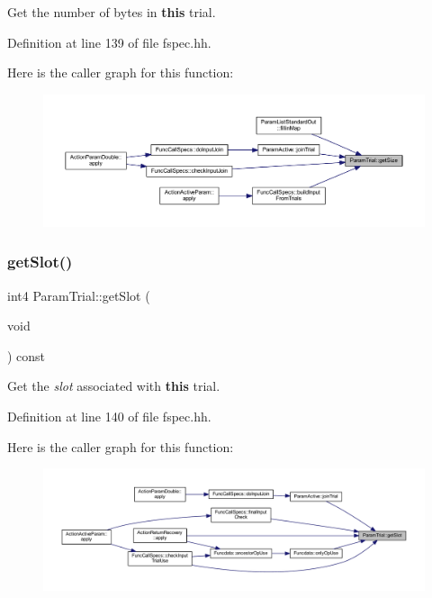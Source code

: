 Get the number of bytes in {\bfseries{this}} trial. 



Definition at line 139 of file fspec.\+hh.

Here is the caller graph for this function\+:
\nopagebreak
\begin{figure}[H]
\begin{center}
\leavevmode
\includegraphics[width=350pt]{class_param_trial_a92758568d74f243b6680258fa8cb440a_icgraph}
\end{center}
\end{figure}
\mbox{\label{class_param_trial_a54cb5c24617993dc4f2a6548059d2e10}} 
\subsubsection{\texorpdfstring{getSlot()}{getSlot()}}
{\footnotesize\ttfamily int4 Param\+Trial\+::get\+Slot (\begin{DoxyParamCaption}\item[{void}]{ }\end{DoxyParamCaption}) const\hspace{0.3cm}{\ttfamily [inline]}}



Get the {\itshape slot} associated with {\bfseries{this}} trial. 



Definition at line 140 of file fspec.\+hh.

Here is the caller graph for this function\+:
\nopagebreak
\begin{figure}[H]
\begin{center}
\leavevmode
\includegraphics[width=350pt]{class_param_trial_a54cb5c24617993dc4f2a6548059d2e10_icgraph}
\end{center}
\end{figure}
\mbox{\label{class_param_trial_a89e3ae18b8365695196d1202d3851e98}} 

